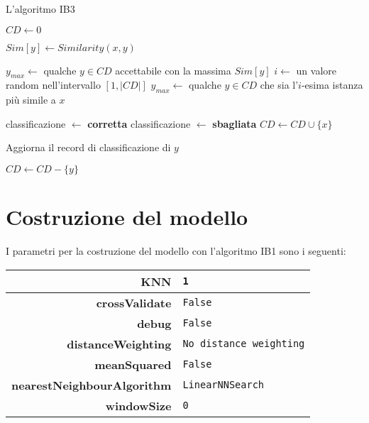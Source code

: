 \begin{algorithm}[!htb]
\caption{L'algoritmo IB3}
\begin{algorithmic}[1]
	\State $CD \gets 0$
  	
    	\State $Sim[y] \gets Similarity(x, y)$
    \EndFor
    
    	\State $y_{max} \gets $ qualche $y \in CD$ accettabile con la massima $Sim[y]$
    \Else
    	\State $i \gets$ un valore random nell'intervallo $[1, |CD|]$
        \State $y_{max} \gets $ qualche $y \in CD$ che sia l'$i$-esima istanza più simile a $x$
    \EndIf
    
    	\State classificazione $\gets$ \textbf{corretta}
    \Else
    	\State classificazione $\gets$ \textbf{sbagliata}
        \State $CD \gets CD \cup \{x\} $
    \EndIf
    
		
        	\State Aggiorna il record di classificazione di $y$
            
            	\State $CD \gets CD - \{y\}$
        	\EndIf
        \EndIf
        
    \EndFor
  \EndFor
\end{algorithmic}
\end{algorithm}

\pagebreak

\section{Costruzione del modello}
I parametri per la costruzione del modello con l'algoritmo IB1 sono i seguenti:
\begin{center}
\begin{tabular}{|r|l|}
	\hline
	\textbf{KNN} & \texttt{1} \\ \hline
	\textbf{crossValidate} & \texttt{False} \\ \hline
	\textbf{debug} & \texttt{False} \\ \hline
	\textbf{distanceWeighting} & \texttt{No distance weighting} \\ \hline
	\textbf{meanSquared} & \texttt{False} \\ \hline
	\textbf{nearestNeighbourAlgorithm} & \texttt{LinearNNSearch} \\ \hline
	\textbf{windowSize} & \texttt{0} \\ \hline
\end{tabular}
\end{center}

